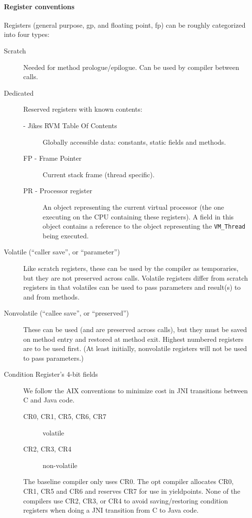 \paragraph{Register conventions}

Registers (general purpose, gp, and floating point, fp) can be roughly
categorized into four types:

\begin{description}
\item[Scratch]
     Needed for method prologue/epilogue.  Can be used by compiler between
     calls.

\item[Dedicated]
     Reserved registers with known contents:
\begin{description}
\item[ - Jikes RVM Table Of Contents]
        Globally accessible data: constants, static fields and methods.

\item[FP - Frame Pointer]
        Current stack frame (thread specific).

\item[PR - Processor register]
        An object representing the current virtual processor (the one
        executing on the CPU containing these registers).  A field in
        this object contains a reference to the object representing
        the {\tt VM\_Thread} being executed.
\end{description}

\item[Volatile (``caller save'', or ``parameter'')]
     Like scratch registers, these can be used by the compiler as
     temporaries, but they are not preserved across calls.  Volatile
     registers differ from scratch registers in that volatiles
     can be used to pass parameters and result(s) to and from
     methods.

\item[Nonvolatile (``callee save'', or ``preserved'')]
     These can be used (and are preserved across calls), but they must be
     saved on method entry and restored at method exit.  Highest numbered
     registers are to be used first.  (At least initially, nonvolatile
     registers will not be used to pass parameters.)

\item[Condition Register's 4-bit fields]
We follow the AIX conventions to minimize cost in JNI transitions
between C and Java code. 
\begin{description}
\item[CR0, CR1, CR5, CR6, CR7] volatile
\item[CR2, CR3, CR4] non-volatile
\end{description}
The baseline compiler only uses CR0.  The opt compiler allocates CR0,
CR1, CR5 and CR6 and reserves CR7 for use in yieldpoints.  None of the
compilers use CR2, CR3, or CR4 to avoid saving/restoring condition
registers when doing a JNI transition from C to Java code. 
\end{description}


